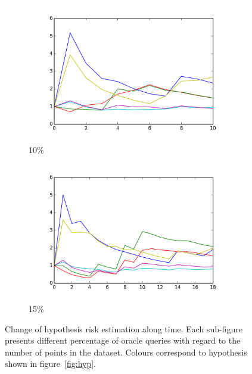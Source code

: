 \documentclass[12pt, a4paper, pdflatex, leqno]{report}
\begin{document}
\begin{figure}[htbp]
    \begin{subfigure}{.5\linewidth}\centering
    \includegraphics[width=1.1\textwidth]{graphics/convergence10.png}
    \caption{10\%\label{fig:conv.ALL:10}}
  \end{subfigure}
  \begin{subfigure}{.5\linewidth}\centering
    \includegraphics[width=1.1\textwidth]{graphics/convergence15.png}
    \caption{15\%\label{fig:conv.ALL:15}}
  \end{subfigure}

  \caption{Change of hypothesis risk estimation along time. Each sub-figure presents different percentage of oracle queries with regard to the number of points in the dataset. Colours correspond to hypothesis shown in figure~\ref{fig:hyp}.\label{fig:conv.ALL}}
\end{figure}
\end{document}
